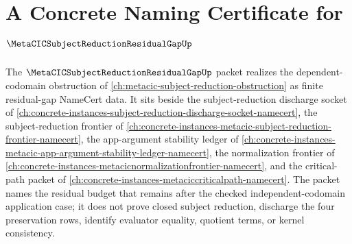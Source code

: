 \chapter{A Concrete Naming Certificate for $\MetaCICSubjectReductionResidualGapUp$}
\label{ch:concrete-instances-metacic-subject-reduction-residual-gap-namecert}

The $\MetaCICSubjectReductionResidualGapUp$ packet realizes the
dependent-codomain obstruction of
\autoref{ch:metacic-subject-reduction-obstruction} as finite residual-gap
NameCert data. It sits beside the subject-reduction discharge socket of
\autoref{ch:concrete-instances-subject-reduction-discharge-socket-namecert},
the subject-reduction frontier of
\autoref{ch:concrete-instances-metacic-subject-reduction-frontier-namecert},
the app-argument stability ledger of
\autoref{ch:concrete-instances-metacic-app-argument-stability-ledger-namecert},
the normalization frontier of
\autoref{ch:concrete-instances-metacicnormalizationfrontier-namecert}, and
the critical-path packet of
\autoref{ch:concrete-instances-metaciccriticalpath-namecert}. The packet names
the residual budget that remains after the checked independent-codomain
application case; it does not prove closed subject reduction, discharge the
four preservation rows, identify evaluator equality, quotient terms, or
kernel consistency.

